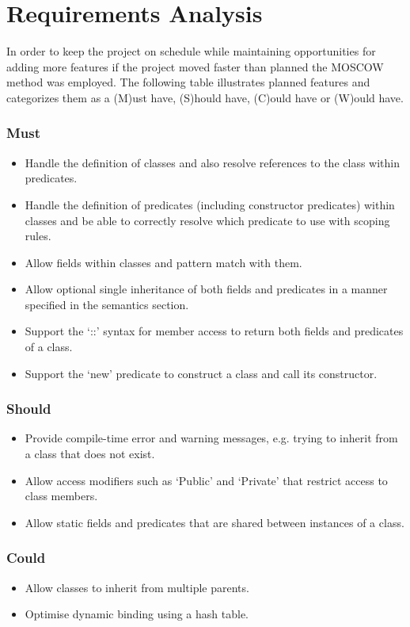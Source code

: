 \documentclass[12pt,a4paper,twoside,openright]{report}
\begin{document}
\section{Requirements Analysis}

In order to keep the project on schedule while maintaining opportunities for adding more features if the project moved faster than planned the MOSCOW method was employed. The following table illustrates planned features and categorizes them as a (M)ust have, (S)hould have, (C)ould have or (W)ould have.

\subsubsection{Must}

\begin{itemize}
	\item Handle the definition of classes and also resolve references to the class within predicates.
	\item Handle the definition of predicates (including constructor predicates) within classes and be able to correctly resolve which predicate to use with scoping rules.
	\item Allow fields within classes and pattern match with them.
	\item Allow optional single inheritance of both fields and predicates in a manner specified in the semantics section.
	\item Support the `::' syntax for member access to return both fields and predicates of a class.
	\item Support the `new' predicate to construct a class and call its constructor.
\end{itemize}


\subsubsection{Should}
\begin{itemize}
	\item Provide compile-time error and warning messages, e.g. trying to inherit from a class that does not exist.
	\item Allow access modifiers such as `Public' and `Private' that restrict access to class members.
	\item Allow static fields and predicates that are shared between instances of a class.
\end{itemize}

\subsubsection{Could}
\begin{itemize}
	\item Allow classes to inherit from multiple parents.
	\item Optimise dynamic binding using a hash table.
\end{itemize}
\end{document}
